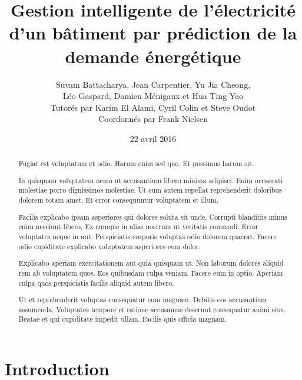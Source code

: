 \documentclass[a4paper]{article}
\author{Suvam Battacharya, Jean Carpentier, Yu Jia Cheong,\\
Léo Gaspard, Damien Ménigaux et Hua Ting Yao\\
Tutorés par Karim El Alami, Cyril Colin et Steve Oudot\\
Coordonnés par Frank Nielsen}
\title{Gestion intelligente de l'électricité d'un bâtiment par prédiction de la
demande énergétique}
\date{22 avril 2016}
\begin{document}
\maketitle
\clearpage

\renewcommand{\abstractname}{Préambule}
\begin{abstract}

Fugiat est voluptatum et odio. Harum enim sed quo. Et possimus harum sit.

In quisquam voluptatem nemo ut accusantium libero minima adipisci. Enim
    occaecati molestiae porro dignissimos molestiae. Ut eum autem repellat
    reprehenderit doloribus dolorem totam amet. Et error consequuntur voluptatem
    et illum.

Facilis explicabo ipsam asperiores qui dolores soluta sit unde. Corrupti
    blanditiis minus enim nesciunt libero. Ex cumque in alias nostrum ut
    veritatis commodi. Error voluptates neque in aut. Perspiciatis corporis
    voluptas odio dolorem quaerat. Facere odio cupiditate explicabo voluptatem
    asperiores eum dolor.

Explicabo aperiam exercitationem aut quia quisquam ut. Non laborum dolores
    aliquid rem ab voluptatem quos. Eos quibusdam culpa veniam. Facere eum in
    optio. Aperiam culpa quos perspiciatis facilis aliquid autem libero.

Ut et reprehenderit voluptas consequatur eum magnam. Debitis eos accusantium
    assumenda. Voluptates tempore et ratione accusamus deserunt consequatur
    animi eius. Beatae et qui cupiditate impedit ullam. Facilis quis officia
    magnam.

\end{abstract}
\clearpage

\tableofcontents
\clearpage

\section*{Introduction}
\end{document}

